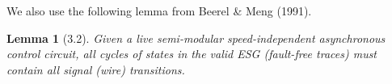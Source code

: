 \documentclass[12pt]{report}
\newtheorem*{lemma}{Lemma}
\begin{document}
We also use the following lemma from Beerel \& Meng (1991).
\begin{lemma}[3.2]Given a live semi-modular speed-independent asynchronous control circuit, all cycles of states in the valid ESG (fault-free traces) must contain all signal (wire) transitions.\\
\end{lemma}
%
%
%


\end{document}

